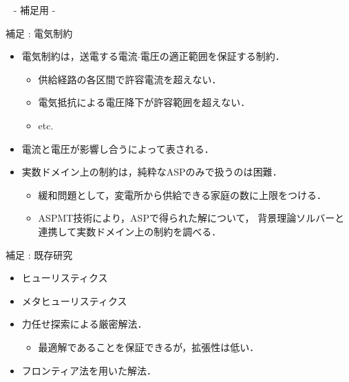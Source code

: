 \appendix
\backupbegin

\begin{frame}{~}
 \centering
 - 補足用 -
\end{frame} 

\begin{frame}{補足 : 電気制約}
 \begin{itemize}
  \item \alert{電気制約}は，送電する電流$\cdot$電圧の適正範囲を保証する制約．
  \begin{itemize}
   \item 供給経路の各区間で許容電流を超えない．
   \item 電気抵抗による電圧降下が許容範囲を超えない．
   \item etc.
  \end{itemize}
  \item 電流と電圧が影響し合うによって表される．
  \item 実数ドメイン上の制約は，純粋なASPのみで扱うのは\alert{困難}．
		\begin{itemize}
		 \item 緩和問題として，変電所から供給できる家庭の数に上限をつける．
		 \item ASPMT技術により，ASPで得られた解について，
			   背景理論ソルバーと連携して実数ドメイン上の制約を調べる．
		\end{itemize}
 \end{itemize}
\end{frame}

\begin{frame}{補足 : 既存研究}
 \begin{itemize}
  \item ヒューリスティクス
  \item メタヒューリスティクス
  \item 力任せ探索による厳密解法．
		\begin{itemize}
		 \item 最適解であることを保証できるが，拡張性は低い．
		\end{itemize}
  \item フロンティア法を用いた解法．
 \end{itemize}
\end{frame}

